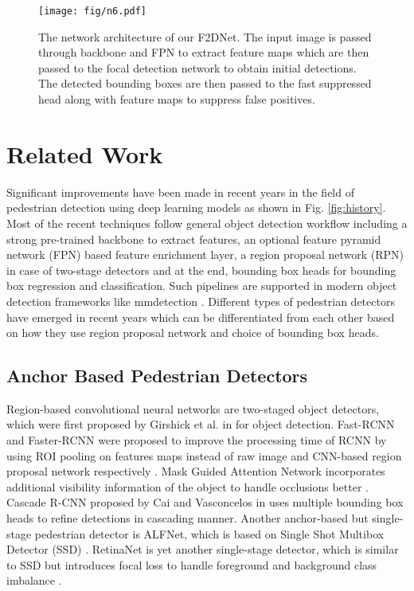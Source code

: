 \documentclass[a4paper,conference]{IEEEtran}
\begin{document}
\begin{figure*}[!t]
    \centering
    \texttt{[image: fig/n6.pdf]}
    \caption{The network architecture of our F2DNet. The input image is passed through backbone and FPN to extract feature maps which are then passed to the focal detection network to obtain initial detections. The detected bounding boxes are then passed to the fast suppressed head along with feature maps to suppress false positives.}
    \label{fig:f2d}
\end{figure*} 















\section{Related Work}
Significant improvements have been made in recent years in the field of pedestrian detection using deep learning models \cite{pedestron, mgan, alfnet, csp} as shown in Fig. \ref{fig:history}. Most of the recent techniques follow general object detection workflow including a strong pre-trained backbone to extract features, an optional feature pyramid network (FPN) \cite{fpn} based feature enrichment layer, a region proposal network (RPN) \cite{fasterrcnn} in case of two-stage detectors and at the end, bounding box heads for bounding box regression and classification. Such pipelines are supported in modern object detection frameworks like mmdetection \cite{mmdetection}. Different types of pedestrian detectors have emerged in recent years which can be differentiated from each other based on how they use region proposal network and choice of bounding box heads.

\subsection{Anchor Based Pedestrian Detectors}
Region-based convolutional neural networks are two-staged object detectors, which were first proposed by Girshick et al. in \cite{rcnn} for object detection. Fast-RCNN and Faster-RCNN were proposed to improve the processing time of RCNN by using ROI pooling on features maps instead of raw image and CNN-based region proposal network respectively \cite{fastrcnn, fasterrcnn}. Mask Guided Attention Network incorporates additional visibility information of the object to handle occlusions better \cite{mgan}. Cascade R-CNN proposed by Cai and Vasconcelos in \cite{cascadercnn} uses multiple bounding box heads to refine detections in cascading manner. Another anchor-based but single-stage pedestrian detector is ALFNet, which is based on Single Shot Multibox Detector (SSD) \cite{alfnet, ssd}. RetinaNet is yet another single-stage detector, which is similar to SSD \cite{ssd} but introduces focal loss to handle foreground and background class imbalance \cite{retinanet}.
\end{document}
